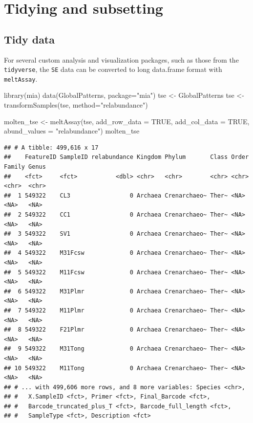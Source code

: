 \documentclass[
]{book}
\newenvironment{Shaded}{\begin{snugshade}}{\end{snugshade}}
\newcommand{\AttributeTok}[1]{\textcolor[rgb]{0.77,0.63,0.00}{#1}}
\newcommand{\ConstantTok}[1]{\textcolor[rgb]{0.00,0.00,0.00}{#1}}
\newcommand{\FunctionTok}[1]{\textcolor[rgb]{0.00,0.00,0.00}{#1}}
\newcommand{\NormalTok}[1]{#1}
\newcommand{\OtherTok}[1]{\textcolor[rgb]{0.56,0.35,0.01}{#1}}
\newcommand{\StringTok}[1]{\textcolor[rgb]{0.31,0.60,0.02}{#1}}
\begin{document}
\hypertarget{tidying-and-subsetting}{%
\section{Tidying and subsetting}\label{tidying-and-subsetting}}

\hypertarget{tidy-data}{%
\subsection{Tidy data}\label{tidy-data}}

For several custom analysis and visualization packages, such as those from the
\texttt{tidyverse}, the \texttt{SE} data can be converted to long data.frame format with
\texttt{meltAssay}.

\begin{Shaded}
\begin{Highlighting}[]
\FunctionTok{library}\NormalTok{(mia)}
\FunctionTok{data}\NormalTok{(GlobalPatterns, }\AttributeTok{package=}\StringTok{"mia"}\NormalTok{)}
\NormalTok{tse }\OtherTok{\textless{}{-}}\NormalTok{ GlobalPatterns}
\NormalTok{tse }\OtherTok{\textless{}{-}} \FunctionTok{transformSamples}\NormalTok{(tse, }\AttributeTok{method=}\StringTok{"relabundance"}\NormalTok{)}

\NormalTok{molten\_tse }\OtherTok{\textless{}{-}} \FunctionTok{meltAssay}\NormalTok{(tse,}
                        \AttributeTok{add\_row\_data =} \ConstantTok{TRUE}\NormalTok{,}
                        \AttributeTok{add\_col\_data =} \ConstantTok{TRUE}\NormalTok{,}
                        \AttributeTok{abund\_values =} \StringTok{"relabundance"}\NormalTok{)}
\NormalTok{molten\_tse}
\end{Highlighting}
\end{Shaded}

\begin{verbatim}
## # A tibble: 499,616 x 17
##    FeatureID SampleID relabundance Kingdom Phylum       Class Order Family Genus
##    <fct>     <fct>           <dbl> <chr>   <chr>        <chr> <chr> <chr>  <chr>
##  1 549322    CL3                 0 Archaea Crenarchaeo~ Ther~ <NA>  <NA>   <NA> 
##  2 549322    CC1                 0 Archaea Crenarchaeo~ Ther~ <NA>  <NA>   <NA> 
##  3 549322    SV1                 0 Archaea Crenarchaeo~ Ther~ <NA>  <NA>   <NA> 
##  4 549322    M31Fcsw             0 Archaea Crenarchaeo~ Ther~ <NA>  <NA>   <NA> 
##  5 549322    M11Fcsw             0 Archaea Crenarchaeo~ Ther~ <NA>  <NA>   <NA> 
##  6 549322    M31Plmr             0 Archaea Crenarchaeo~ Ther~ <NA>  <NA>   <NA> 
##  7 549322    M11Plmr             0 Archaea Crenarchaeo~ Ther~ <NA>  <NA>   <NA> 
##  8 549322    F21Plmr             0 Archaea Crenarchaeo~ Ther~ <NA>  <NA>   <NA> 
##  9 549322    M31Tong             0 Archaea Crenarchaeo~ Ther~ <NA>  <NA>   <NA> 
## 10 549322    M11Tong             0 Archaea Crenarchaeo~ Ther~ <NA>  <NA>   <NA> 
## # ... with 499,606 more rows, and 8 more variables: Species <chr>,
## #   X.SampleID <fct>, Primer <fct>, Final_Barcode <fct>,
## #   Barcode_truncated_plus_T <fct>, Barcode_full_length <fct>,
## #   SampleType <fct>, Description <fct>
\end{verbatim}
\end{document}
